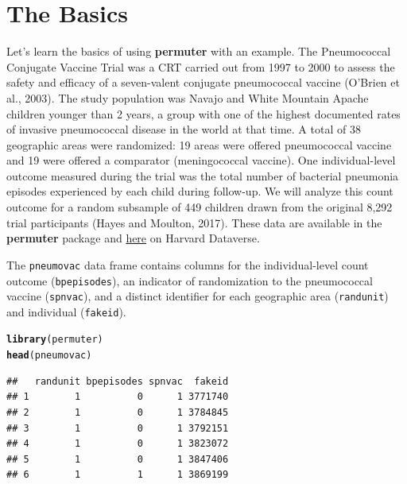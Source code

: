 \documentclass[12pt]{article}\usepackage[]{graphicx}\usepackage[]{color}
\makeatletter
\newcommand{\hlstd}[1]{\textcolor[rgb]{0.345,0.345,0.345}{#1}}%
\newcommand{\hlkwd}[1]{\textcolor[rgb]{0.737,0.353,0.396}{\textbf{#1}}}%
\newenvironment{kframe}{%
 \def\at@end@of@kframe{}%
 \ifinner\ifhmode%
  \def\at@end@of@kframe{\end{minipage}}%
  \begin{minipage}{\columnwidth}%
 \fi\fi%
 \def\FrameCommand##1{\hskip\@totalleftmargin \hskip-\fboxsep
 \colorbox{shadecolor}{##1}\hskip-\fboxsep
     \hskip-\linewidth \hskip-\@totalleftmargin \hskip\columnwidth}%
 \MakeFramed {\advance\hsize-\width
   \@totalleftmargin\z@ \linewidth\hsize
   \@setminipage}}%
 {\par\unskip\endMakeFramed%
 \at@end@of@kframe}
\newenvironment{knitrout}{}{} %
\makeatother
\begin{document}
\section{The Basics}
Let's learn the basics of using \textbf{permuter} with an example. The Pneumococcal Conjugate Vaccine Trial was a CRT carried out from 1997 to 2000 to assess the safety and efficacy of a seven-valent conjugate pneumococcal vaccine (O'Brien et al., 2003). The study population was Navajo and White Mountain Apache children younger than 2 years, a group with one of the highest documented rates of invasive pneumococcal disease in the world at that time. A total of 38 geographic areas were randomized: 19 areas were offered pneumococcal vaccine and 19 were offered a comparator (meningococcal vaccine). One individual-level outcome measured during the trial was the total number of bacterial pneumonia episodes experienced by each child during follow-up. We will analyze this count outcome for a random subsample of 449 children drawn from the original 8,292 trial participants (Hayes and Moulton, 2017). These data are available in the \textbf{permuter} package and \href{https://dataverse.harvard.edu/dataverse/crt}{here} on Harvard Dataverse.

The \texttt{pneumovac} data frame contains columns for the individual-level count outcome (\texttt{bpepisodes}), an indicator of randomization to the pneumococcal vaccine (\texttt{spnvac}), and a distinct identifier for each geographic area (\texttt{randunit}) and individual (\texttt{fakeid}).
\begin{knitrout}
\color{fgcolor}\begin{kframe}
\begin{alltt}
\hlkwd{library}\hlstd{(permuter)}
\hlkwd{head}\hlstd{(pneumovac)}
\end{alltt}
\begin{verbatim}
##   randunit bpepisodes spnvac  fakeid
## 1        1          0      1 3771740
## 2        1          0      1 3784845
## 3        1          0      1 3792151
## 4        1          0      1 3823072
## 5        1          0      1 3847406
## 6        1          1      1 3869199
\end{verbatim}
\end{kframe}
\end{knitrout}
\end{document}
